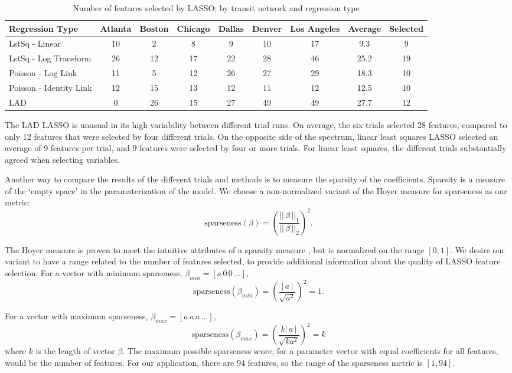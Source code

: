 \documentclass[11pt]{report}
\begin{document}
\begin{table}[H]
\begingroup\fontsize{10}{15}\selectfont
\centering
\begin{tabular}{l|cccccc|cc}
Regression Type&Atlanta&Boston&Chicago&Dallas&Denver&Los Angeles&Average&Selected\\
\midrule
LstSq - Linear&10&2&8&9&10&17&9.3&9\\
LstSq - Log Transform&26&12&17&22&28&46&25.2&19\\
Poisson - Log Link&11&5&12&26&27&29&18.3&10\\
Poisson - Identity Link&12&15&13&12&11&12&12.5&10\\
LAD&0&26&15&27&49&49&27.7&12\\
\end{tabular}
\caption{Number of features selected by LASSO; by transit network and regression type}\label{tab:lassoFeat0Norm}
\endgroup
\end{table}



The LAD LASSO is unusual in its high variability between different trial runs. On average, the six trials selected 28 features, compared to only 12 features that were selected by four different trials. On the opposite side of the spectrum, linear least squares LASSO selected an average of 9 features per trial, and 9 features were selected by four or more trials. For linear least squares, the different trials substantially agreed when selecting variables.

Another way to compare the results of the different trials and methods is to measure the sparsity  of the coefficients. Sparsity is a measure of the `empty space' in the paramaterization of the model. We choose a non-normalized variant of the Hoyer measure for sparseness \cite{Hoyer2004} as our metric: 
$$\text{sparseness}(\beta) = \left(\frac{||\,\beta\,||_1}{||\,\beta\,||_2}\right)^2.$$

The Hoyer measure is proven to meet the intuitive attributes of a sparsity measure \cite{Hurley2009}, but is normalized on the range $[0, 1]$. We desire our variant to have a range related to the number of features selected, to provide additional information about the quality of LASSO feature selection. For a vector with minimum sparseness, $\beta_{min} = \left[a\,0\,0\, ...\right]$, 
\[\text{sparseness}(\beta_{min}) = \left(\frac{|\,a\,|}{\sqrt{a^2}}\right)^2 = 1.\]

For a vector with maximum sparseness, $\beta_{max} = \left[a\,a\,a\,...\right]$,
\[\text{sparseness}(\beta_{max}) = \left(\frac{k|\,a\,|}{\sqrt{ka^2}}\right)^2 = k\] where $k$ is the length of vector $\beta$. The maximum possible sparseness score, for a parameter vector with equal coefficients for all features, would be the number of features. For our application, there are 94 features, so the range of the sparseness metric is $[1, 94]$.
\end{document}
